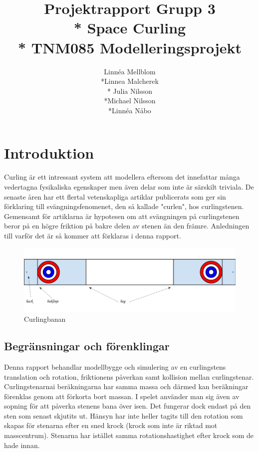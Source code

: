 \documentclass[11pt]{article} %
\title{Projektrapport Grupp 3 \\* 
Space Curling\\*
TNM085 Modelleringsprojekt}
\author{Linnéa Mellblom\\*Linnea Malcherek\\* Julia Nilsson\\*Michael Nilsson\\*Linnéa Nåbo}
\begin{document}
\maketitle
\pagebreak
{}  

\pagebreak
\tableofcontents
\pagebreak

\section{Introduktion}
Curling är ett intressant system att modellera eftersom det innefattar många vedertagna fysikaliska egenskaper men även delar som inte är särskilt triviala. 
De senaste åren har ett flertal vetenskapliga artiklar publicerats som ger sin förklaring till svängningsfenomenet, den så kallade "curlen", hos curlingstenen.
Gemensamt för artiklarna är hypotesen om att svängningen på curlingstenen beror på en högre friktion på bakre delen av stenen än den främre. 
Anledningen till varför det är så kommer att förklaras i denna rapport.

\begin{figure}[ht!]
\centering
\includegraphics[width=140mm]{bana.png}
\caption{Curlingbanan}
\label{fig:bana}
\label{overflow}
\end{figure}

\subsection{Begränsningar och förenklingar} 
Denna rapport behandlar modellbygge och simulering av en curlingstens translation
och rotation, friktionens påverkan samt kollision mellan curlingstenar. 
Curlingstenarnai beräkningarna har samma massa och därmed kan beräkningar förenklas genom att
förkorta bort massan. I spelet använder man sig även av sopning för att påverka stenens
bana över isen. Det fungerar dock endast på den sten som senast skjutits ut. Hänsyn har
inte heller tagits till den rotation som skapas för stenarna efter en sned krock (krock som
inte är riktad mot masscentrum). Stenarna har istället samma rotationshastighet efter
krock som de hade innan.
\end{document}
